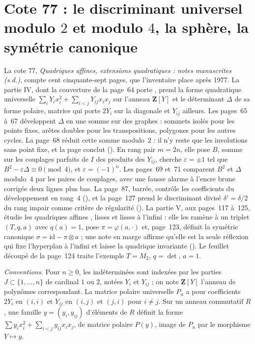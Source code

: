 \section[Cote 77 : le discriminant universel modulo 2 et modulo 4, la sphère, la symétrie canonique]{Cote 77 : le discriminant universel modulo $2$ et modulo $4$, la sphère, la symétrie canonique\protect{}}\label{sec:77}

La cote 77, \emph{Quadriques affines, extensions quadratiques : notes manuscrites (s.d.)}, compte cent cinquante-sept pages, que l'inventaire place après 1977. La partie IV, dont la couverture de la page~64 porte , prend la forme quadratique universelle $\sum_i Y_i x_i^2 + \sum_{i<j} Y_{ij} x_i x_j$ sur l'anneau $\mathbf Z[Y]$ et le déterminant $\Delta$ de sa forme polaire, matrice qui porte $2Y_i$ sur la diagonale et $Y_{ij}$ ailleurs. Les pages~65 à~67 développent $\Delta$ en une somme sur des graphes : sommets isolés pour les points fixes, arêtes doubles pour les transpositions, polygones pour les autres cycles. La page~68 réduit cette somme modulo~$2$ : il n'y reste que les involutions sans point fixe, et la page conclut  (). En rang pair $m = 2n$, elle pose $B$, somme sur les couplages parfaits de $I$ des produits des $Y_{ij}$, cherche $\varepsilon = \pm 1$ tel que $B^2 - \varepsilon\Delta \equiv 0 \pmod 4$, et  $\varepsilon = (-1)^n$. Les pages~69 et~71 comparent $B^2$ et $\Delta$ modulo~$4$ par les paires de couplages, avec une fausse alarme à l'encre brune corrigée deux lignes plus bas. La page~87, barrée, contrôle les coefficients du développement en rang~$4$ (), et la page~127 prend le discriminant divisé $\delta' = \delta/2$ du rang impair comme critère de régularité (). La partie V, aux pages~117 à~125, étudie les quadriques affines , lisses et lisses à l'infini : elle les ramène à un triplet $(T, q, a)$ avec $q(a) = 1$, pose $\pi = \varphi(a, \cdot)$ et, page~123, définit la symétrie canonique $\sigma = \mathrm{id} - \pi \otimes a$ ; une note en marge affirme qu'elle est la seule réflexion qui fixe l'hyperplan à l'infini et laisse la quadrique invariante (). Le feuillet découpé de la page~124 traite l'exemple $T = M_2$, $q = \det$, $a = 1$.

\noindent\emph{Conventions.} Pour $n \geq 0$, les indéterminées sont indexées par les parties $J \subset \{1, \dots, n\}$ de cardinal $1$ ou $2$, notées $Y_i$ et $Y_{ij}$ ; on note $\mathbf Z[Y]$ l'anneau de polynômes correspondant. La matrice polaire universelle $P_n$ a pour coefficients $2Y_i$ en $(i, i)$ et $Y_{ij}$ en $(i, j)$ et $(j, i)$ pour $i \neq j$. Sur un anneau commutatif $R$, une famille $y = (y_i, y_{ij})$ d'éléments de $R$ définit la forme $\sum y_i x_i^2 + \sum_{i<j} y_{ij} x_i x_j$, de matrice polaire $P(y)$, image de $P_n$ par le morphisme $Y \mapsto y$.

